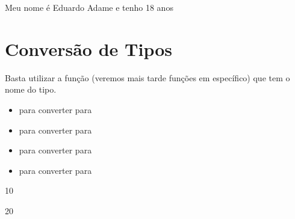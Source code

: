 \documentclass[letterpaper,10pt,english]{jupyterBook}
\begin{document}
\begin{sphinxVerbatim}[commandchars=\\\{\}]
\PYGZsq{}Meu nome é Eduardo Adame e tenho 18 anos\PYGZsq{}
\end{sphinxVerbatim}


\section{Conversão de Tipos}
\label{\detokenize{chapters/2:conversao-de-tipos}}
\sphinxAtStartPar
Basta utilizar a função (veremos mais tarde funções em específico) que tem o nome do tipo.
\begin{itemize}
\item {} 
\sphinxAtStartPar
{} para converter para 

\item {} 
\sphinxAtStartPar
{} para converter para 

\item {} 
\sphinxAtStartPar
{} para converter para 

\item {} 
\sphinxAtStartPar
{} para converter para 

\end{itemize}

\begin{sphinxVerbatim}[commandchars=\\\{\}]
\end{sphinxVerbatim}

\begin{sphinxVerbatim}[commandchars=\\\{\}]
10
\end{sphinxVerbatim}

\begin{sphinxVerbatim}[commandchars=\\\{\}]
\end{sphinxVerbatim}

\begin{sphinxVerbatim}[commandchars=\\\{\}]
20
\end{sphinxVerbatim}
\end{document}
